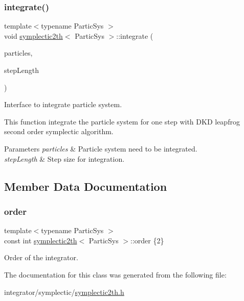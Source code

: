 \subsubsection{\texorpdfstring{integrate()}{integrate()}}
{\footnotesize\ttfamily template$<$typename Partic\+Sys $>$ \\
void \mbox{\hyperlink{classsymplectic2th}{symplectic2th}}$<$ Partic\+Sys $>$\+::integrate (\begin{DoxyParamCaption}\item[{Partic\+Sys \&}]{particles,  }\item[{\mbox{\hyperlink{classsymplectic2th_a801a87947fe8e90ee68759952c937ed5}{Scalar}}}]{step\+Length }\end{DoxyParamCaption})}



Interface to integrate particle system. 

This function integrate the particle system for one step with D\+KD leapfrog second order symplectic algorithm. 
\begin{DoxyParams}{Parameters}
{\em particles} & Particle system need to be integrated. \\
\hline
{\em step\+Length} & Step size for integration. \\
\hline
\end{DoxyParams}


\subsection{Member Data Documentation}
\mbox{\label{classsymplectic2th_a1082d668c1081ff0116e8816f1240fcd}} 
\subsubsection{\texorpdfstring{order}{order}}
{\footnotesize\ttfamily template$<$typename Partic\+Sys $>$ \\
const int \mbox{\hyperlink{classsymplectic2th}{symplectic2th}}$<$ Partic\+Sys $>$\+::order \{2\}\hspace{0.3cm}{\ttfamily [static]}}



Order of the integrator. 



The documentation for this class was generated from the following file\+:\begin{DoxyCompactItemize}
\item 
integrator/symplectic/\mbox{\hyperlink{symplectic2th_8h}{symplectic2th.\+h}}\end{DoxyCompactItemize}
